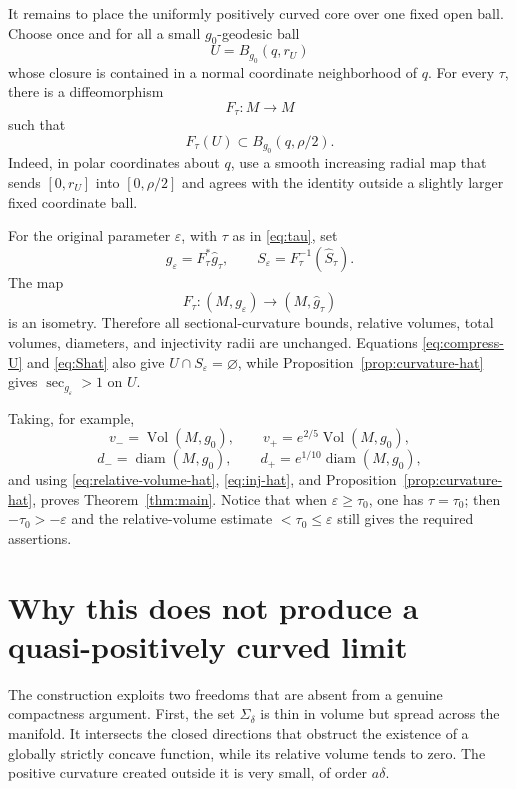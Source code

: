 \documentclass[11pt]{amsart}
\theoremstyle{definition}
\newcommand{\Vol}{\operatorname{Vol}}
\newcommand{\diam}{\operatorname{diam}}
\begin{document}
It remains to place the uniformly positively curved core over one fixed open ball.  Choose once and for all a small $g_0$-geodesic ball
\[
 U=B_{g_0}(q,r_U)
\]
whose closure is contained in a normal coordinate neighborhood of $q$.  For every $\tau$, there is a diffeomorphism
\[
 F_\tau:M\longrightarrow M
\]
such that
\begin{equation}\label{eq:compress-U}
 F_\tau(U)\subset B_{g_0}(q,\rho/2).
\end{equation}
Indeed, in polar coordinates about $q$, use a smooth increasing radial map that sends $[0,r_U]$ into $[0,\rho/2]$ and agrees with the identity outside a slightly larger fixed coordinate ball.

For the original parameter $\varepsilon$, with $\tau$ as in
\eqref{eq:tau}, set
\begin{equation}\label{eq:final-def}
 g_\varepsilon=F_\tau^*\widehat g_\tau,
 \qquad
 S_\varepsilon=F_\tau^{-1}(\widehat S_\tau).
\end{equation}
The map
\[
 F_\tau:(M,g_\varepsilon)\longrightarrow(M,\widehat g_\tau)
\]
is an isometry.  Therefore all sectional-curvature bounds, relative volumes, total volumes, diameters, and injectivity radii are unchanged.  Equations
\eqref{eq:compress-U} and \eqref{eq:Shat} also give
$U\cap S_\varepsilon=\varnothing$, while Proposition~\ref{prop:curvature-hat} gives
$\sec_{g_\varepsilon}>1$ on $U$.

Taking, for example,
\[
 v_-=\Vol(M,g_0),\qquad
 v_+=e^{2/5}\Vol(M,g_0),
\]
\[
 d_-=\diam(M,g_0),\qquad
 d_+=e^{1/10}\diam(M,g_0),
\]
and using \eqref{eq:relative-volume-hat},
\eqref{eq:inj-hat}, and Proposition~\ref{prop:curvature-hat}, proves
Theorem~\ref{thm:main}.  Notice that when $\varepsilon\ge\tau_0$, one has $\tau=\tau_0$; then
$-\tau_0> -\varepsilon$ and the relative-volume estimate
$<\tau_0\le\varepsilon$ still gives the required assertions.

\section{Why this does not produce a quasi-positively curved limit}

The construction exploits two freedoms that are absent from a genuine compactness argument.
First, the set $\Sigma_\delta$ is thin in volume but spread across the manifold.  It intersects the closed directions that obstruct the existence of a globally strictly concave function, while its relative volume tends to zero.  The positive curvature created outside it is very small, of order $a\delta$.
\end{document}
